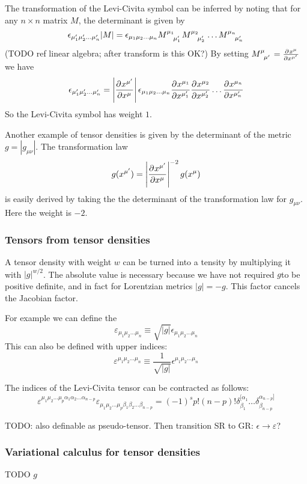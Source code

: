 The transformation of the Levi-Civita symbol can be inferred by noting that for any $n\times n$ matrix $M$, the determinant is given by
\[ \epsilon_{\mu'_1\mu'_2\ldots \mu'_n}|M| = \epsilon_{\mu_1\mu_2 \ldots \mu_n}\tensor{M}{^{\mu_1}_{\mu'_1}}\tensor{M}{^{\mu_2}_{\mu'_2}}\ldots \tensor{M}{^{\mu_n}_{\mu'_n}} \]
(TODO ref linear algebra; after transform is this OK?) By setting $\tensor{M}{^{\mu}_{\mu'}} = \pd{x^\mu}{x^{\mu'}}$ we have
\[ \epsilon_{\mu'_1\mu'_2\ldots\mu'_n} = \left| \frac{\partial{^{}}x^{\mu'}}{\partial{{x^\mu}^{}}} \right|\epsilon_{\mu_1\mu_2\ldots\mu_n} \frac{\partial{^{}}x^{\mu_1}}{\partial{{x^{\mu'_1}}^{}}}  \frac{\partial{^{}}x^{\mu_2}}{\partial{{x^{\mu'_2}}^{}}} \ldots  \frac{\partial{^{}}x^{\mu_n}}{\partial{{x^{\mu'_n}}^{}}}  \]
So the Levi-Civita symbol has weight $1$.

Another example of tensor densities is given by the determinant of the metric $g = |g_{\mu\nu}|$. The transformation law
\[g(x^{\mu'}) = \left| \frac{\partial{^{}}x^{\mu'}}{\partial{{x^\mu}^{}}} \right|^{-2} g(x^\mu)\]
is easily derived by taking the the determinant of the transformation law for $g_{\mu\nu}$. Here the weight is $-2$.

\subsubsection{Tensors from tensor densities}
A tensor density with weight $w$ can be turned into a tensity by multiplying it with $|g|^{w/2}$. The absolute value is necessary because we have not required $g$to be positive definite, and in fact for Lorentzian metrics $|g| = -g$. This factor cancels the Jacobian factor.

For example we can define the 
\[ \varepsilon_{\mu_1\mu_2\ldots\mu_n} \equiv \sqrt{|g|}\epsilon_{\mu_1\mu_2\ldots\mu_n} \]
This can also be defined with upper indices:
\[ \varepsilon^{\mu_1\mu_2\ldots\mu_n} \equiv \frac{1}{\sqrt{|g|}}\epsilon^{\mu_1\mu_2\ldots\mu_n} \]

The indices of the Levi-Civita tensor can be contracted as follows:
\[ \varepsilon^{\mu_1\mu_2\ldots\mu_p\alpha_1\alpha_2\ldots\alpha_{n-p}}\varepsilon_{\mu_1\mu_2\ldots\mu_p\beta_1\beta_2\ldots\beta_{n-p}} = (-1)^sp!(n-p)!\delta_{\beta_1}^{[\alpha_1}\ldots\delta_{\beta_{n-p}}^{\alpha_{n-p}]} \]

TODO: also definable as pseudo-tensor. Then transition SR to GR: $\epsilon \to \varepsilon$?

\subsubsection{Variational calculus for tensor densities}
TODO $g$

